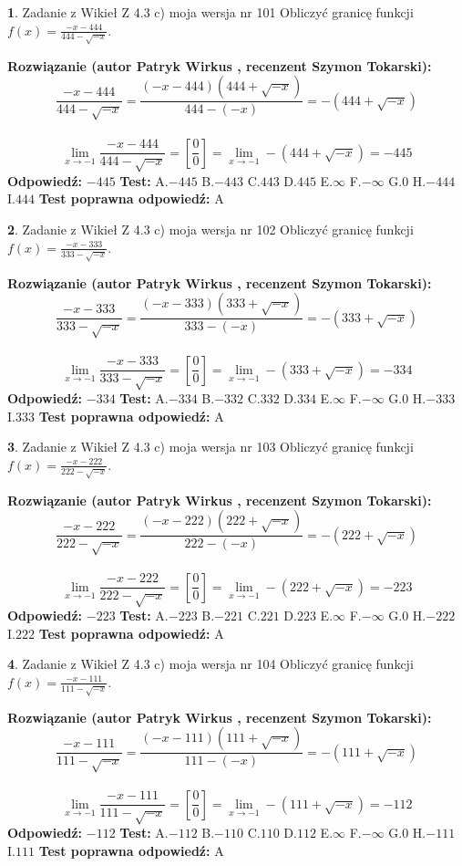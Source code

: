 \documentclass[12pt, a4paper]{article}
\theoremstyle{definition} %
\newtheorem{zad}{}
\newcommand{\zadStart}[1]{\begin{zad}#1\newline}
\newcommand{\zadStop}{\end{zad}}
\newcommand{\rozwStart}[2]{\noindent \textbf{Rozwiązanie (autor #1 , recenzent #2): }\newline}
\newcommand{\rozwStop}{\newline}
\newcommand{\odpStart}{\noindent \textbf{Odpowiedź:}\newline}
\newcommand{\odpStop}{\newline}
\newcommand{\testStart}{\noindent \textbf{Test:}\newline}
\newcommand{\testStop}{\newline}
\newcommand{\kluczStart}{\noindent \textbf{Test poprawna odpowiedź:}\newline}
\newcommand{\kluczStop}{\newline}
\begin{document}
\zadStart{Zadanie z Wikieł Z 4.3 c) moja wersja nr 101}
Obliczyć granicę funkcji $f(x)=\frac{-x-444}{444-\sqrt{-x}}$.
\zadStop
\rozwStart{Patryk Wirkus}{Szymon Tokarski}
$$\frac{-x-444}{444-\sqrt{-x}}=\frac{(-x-444)(444+\sqrt{-x})}{444-(-x)}=-(444+\sqrt{-x})$$
\\
$$\lim\limits_{x\to-1}\frac{-x-444}{444-\sqrt{-x}}=[\frac{0}{0}]=\lim\limits_{x\to-1}-(444+\sqrt{-x}) =-445$$
\rozwStop
\odpStart
$-445$
\odpStop
\testStart
A.$-445$
B.$-443$
C.$443$
D.$445$
E.$\infty$
F.$-\infty$
G.$0$
H.$-444$
I.$444$
\testStop
\kluczStart
A
\kluczStop



\zadStart{Zadanie z Wikieł Z 4.3 c) moja wersja nr 102}
Obliczyć granicę funkcji $f(x)=\frac{-x-333}{333-\sqrt{-x}}$.
\zadStop
\rozwStart{Patryk Wirkus}{Szymon Tokarski}
$$\frac{-x-333}{333-\sqrt{-x}}=\frac{(-x-333)(333+\sqrt{-x})}{333-(-x)}=-(333+\sqrt{-x})$$
\\
$$\lim\limits_{x\to-1}\frac{-x-333}{333-\sqrt{-x}}=[\frac{0}{0}]=\lim\limits_{x\to-1}-(333+\sqrt{-x}) =-334$$
\rozwStop
\odpStart
$-334$
\odpStop
\testStart
A.$-334$
B.$-332$
C.$332$
D.$334$
E.$\infty$
F.$-\infty$
G.$0$
H.$-333$
I.$333$
\testStop
\kluczStart
A
\kluczStop



\zadStart{Zadanie z Wikieł Z 4.3 c) moja wersja nr 103}
Obliczyć granicę funkcji $f(x)=\frac{-x-222}{222-\sqrt{-x}}$.
\zadStop
\rozwStart{Patryk Wirkus}{Szymon Tokarski}
$$\frac{-x-222}{222-\sqrt{-x}}=\frac{(-x-222)(222+\sqrt{-x})}{222-(-x)}=-(222+\sqrt{-x})$$
\\
$$\lim\limits_{x\to-1}\frac{-x-222}{222-\sqrt{-x}}=[\frac{0}{0}]=\lim\limits_{x\to-1}-(222+\sqrt{-x}) =-223$$
\rozwStop
\odpStart
$-223$
\odpStop
\testStart
A.$-223$
B.$-221$
C.$221$
D.$223$
E.$\infty$
F.$-\infty$
G.$0$
H.$-222$
I.$222$
\testStop
\kluczStart
A
\kluczStop



\zadStart{Zadanie z Wikieł Z 4.3 c) moja wersja nr 104}
Obliczyć granicę funkcji $f(x)=\frac{-x-111}{111-\sqrt{-x}}$.
\zadStop
\rozwStart{Patryk Wirkus}{Szymon Tokarski}
$$\frac{-x-111}{111-\sqrt{-x}}=\frac{(-x-111)(111+\sqrt{-x})}{111-(-x)}=-(111+\sqrt{-x})$$
\\
$$\lim\limits_{x\to-1}\frac{-x-111}{111-\sqrt{-x}}=[\frac{0}{0}]=\lim\limits_{x\to-1}-(111+\sqrt{-x}) =-112$$
\rozwStop
\odpStart
$-112$
\odpStop
\testStart
A.$-112$
B.$-110$
C.$110$
D.$112$
E.$\infty$
F.$-\infty$
G.$0$
H.$-111$
I.$111$
\testStop
\kluczStart
A
\kluczStop
\end{document}
